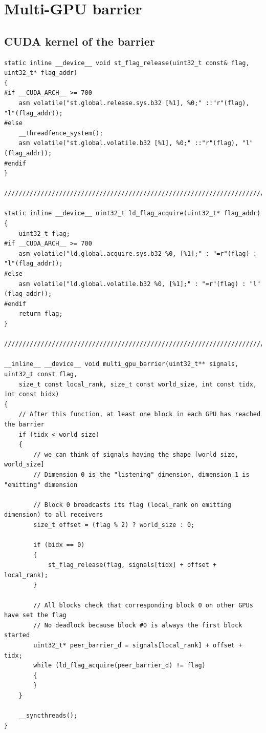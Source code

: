 \documentclass[acmsmall]{acmart}
\begin{document}



\appendix

\section{Multi-GPU barrier}

\subsection{CUDA kernel of the barrier}

\lstset{language=CUDA}
\begin{lstlisting}[caption={\href{https://github.com/NVIDIA/TensorRT-LLM/blob/75057cd036af25e288c004d8ac9e52fd2d6224aa/cpp/tensorrt_llm/kernels/customAllReduceKernels.cu}{\texttt{customAllReduceKernels.cu}} of NVIDIA \href{https://github.com/NVIDIA/TensorRT-LLM/}{\faGithub~TensorRT-LLM}.}, label={lst:barrier}]
static inline __device__ void st_flag_release(uint32_t const& flag, uint32_t* flag_addr)
{
#if __CUDA_ARCH__ >= 700
    asm volatile("st.global.release.sys.b32 [%1], %0;" ::"r"(flag), "l"(flag_addr));
#else
    __threadfence_system();
    asm volatile("st.global.volatile.b32 [%1], %0;" ::"r"(flag), "l"(flag_addr));
#endif
}

///////////////////////////////////////////////////////////////////////////////////

static inline __device__ uint32_t ld_flag_acquire(uint32_t* flag_addr)
{
    uint32_t flag;
#if __CUDA_ARCH__ >= 700
    asm volatile("ld.global.acquire.sys.b32 %0, [%1];" : "=r"(flag) : "l"(flag_addr));
#else
    asm volatile("ld.global.volatile.b32 %0, [%1];" : "=r"(flag) : "l"(flag_addr));
#endif
    return flag;
}

///////////////////////////////////////////////////////////////////////////////////

__inline__ __device__ void multi_gpu_barrier(uint32_t** signals, uint32_t const flag,
    size_t const local_rank, size_t const world_size, int const tidx, int const bidx)
{
    // After this function, at least one block in each GPU has reached the barrier
    if (tidx < world_size)
    {
        // we can think of signals having the shape [world_size, world_size]
        // Dimension 0 is the "listening" dimension, dimension 1 is "emitting" dimension

        // Block 0 broadcasts its flag (local_rank on emitting dimension) to all receivers
        size_t offset = (flag % 2) ? world_size : 0;

        if (bidx == 0)
        {
            st_flag_release(flag, signals[tidx] + offset + local_rank);
        }

        // All blocks check that corresponding block 0 on other GPUs have set the flag
        // No deadlock because block #0 is always the first block started
        uint32_t* peer_barrier_d = signals[local_rank] + offset + tidx;
        while (ld_flag_acquire(peer_barrier_d) != flag)
        {
        }
    }

    __syncthreads();
}
\end{lstlisting}
\end{document}
